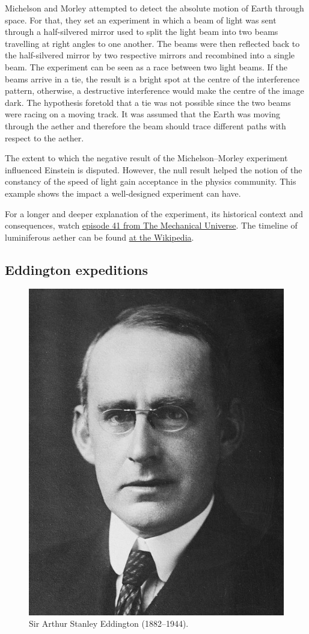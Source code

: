 \documentclass[
]{book}
\begin{document}
Michelson and Morley attempted to detect the absolute motion of Earth through space. For that, they set an experiment in which a beam of light was sent through a half-silvered mirror used to split the light beam into two beams travelling at right angles to one another. The beams were then reflected back to the half-silvered mirror by two respective mirrors and recombined into a single beam. The experiment can be seen as a race between two light beams. If the beams arrive in a tie, the result is a bright spot at the centre of the interference pattern, otherwise, a destructive interference would make the centre of the image dark. The hypothesis foretold that a tie was not possible since the two beams were racing on a moving track. It was assumed that the Earth was moving through the aether and therefore the beam should trace different paths with respect to the aether.

The extent to which the negative result of the Michelson--Morley experiment influenced Einstein is disputed. However, the null result helped the notion of the constancy of the speed of light gain acceptance in the physics community. This example shows the impact a well-designed experiment can have.

For a longer and deeper explanation of the experiment, its historical context and consequences, watch \href{https://www.youtube.com/watch?v=Ip_jdcA8fcw}{episode 41 from The Mechanical Universe}. The timeline of luminiferous aether can be found \href{https://en.wikipedia.org/wiki/Timeline_of_luminiferous_aether}{at the Wikipedia}.

\hypertarget{eddington-expeditions}{%
\subsection{Eddington expeditions}\label{eddington-expeditions}}

\begin{figure}  
 \begin{center}
    \includegraphics[width=.22\textwidth]{Figures/Arthur_Stanley_Eddington.jpg}  
  \captionsetup{labelformat=empty}
  \caption{Sir Arthur Stanley Eddington (1882–1944).} 
\end{center}
\end{figure}
\addtocounter{figure}{-1}
\end{document}
